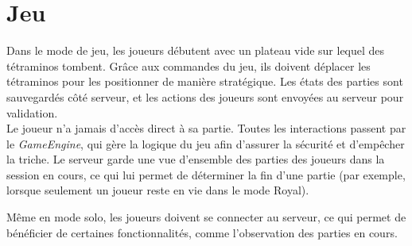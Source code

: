 \documentclass{report}
\begin{document}
\section{Jeu}

\noindent Dans le mode de jeu, les joueurs débutent avec un plateau vide sur lequel des tétraminos tombent. Grâce aux commandes du jeu, ils doivent déplacer les tétraminos pour les positionner de manière stratégique. Les états des parties sont sauvegardés côté serveur, et les actions des joueurs sont envoyées au serveur pour validation. \\

\noindent Le joueur n'a jamais d'accès direct à sa partie. Toutes les interactions passent par le \emph{GameEngine}, qui gère la logique du jeu afin d'assurer la sécurité et d'empêcher la triche. Le serveur garde une vue d'ensemble des parties des joueurs dans la session en cours, ce qui lui permet de déterminer la fin d'une partie (par exemple, lorsque seulement un joueur reste en vie dans le mode Royal).

\noindent Même en mode solo, les joueurs doivent se connecter au serveur, ce qui permet de bénéficier de certaines fonctionnalités, comme l’observation des parties en cours.
\end{document}
